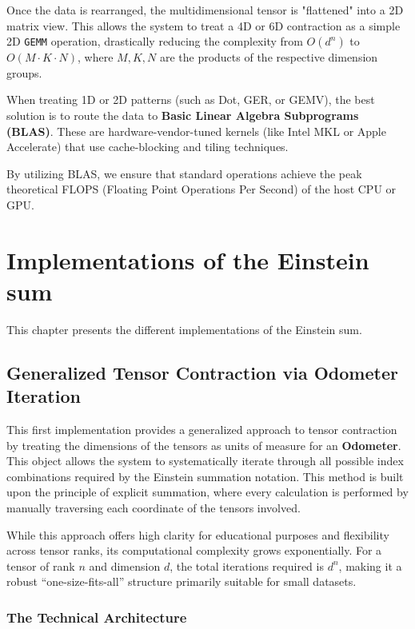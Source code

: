 \documentclass[binding=0.6cm]{sapthesis}
\begin{document}
\begin{description}
	      Once the data is rearranged, the multidimensional tensor is "flattened" into a 2D matrix view. This allows the system to treat a 4D or 6D contraction as a simple 2D \texttt{GEMM} operation, drastically reducing the complexity from $O(d^n)$ to $O(M \cdot K \cdot N)$, where $M, K, N$ are the products of the respective dimension groups.

	\item [BLAS Pattern Dispatching:]
	      When treating 1D or 2D patterns (such as Dot, GER, or GEMV), the best solution is to route the data to \textbf{Basic Linear Algebra Subprograms (BLAS)}. These are hardware-vendor-tuned kernels (like Intel MKL or Apple Accelerate) that use cache-blocking and tiling techniques.

	      By utilizing BLAS, we ensure that standard operations achieve the peak theoretical FLOPS (Floating Point Operations Per Second) of the host CPU or GPU.
\end{description}

\chapter{Implementations of the Einstein sum}
\label{chap:Implementations}

\noindent This chapter presents the different implementations of the Einstein sum.

\section{Generalized Tensor Contraction via Odometer Iteration}

This first implementation provides a generalized approach to tensor contraction by treating the dimensions of the tensors as units of measure for an \textbf{Odometer}. This object allows the system to systematically iterate through all possible index combinations required by the Einstein summation notation. This method is built upon the principle of explicit summation, where every calculation is performed by manually traversing each coordinate of the tensors involved.

While this approach offers high clarity for educational purposes and flexibility across tensor ranks, its computational complexity grows exponentially. For a tensor of rank $n$ and dimension $d$, the total iterations required is $d^n$, making it a robust ``one-size-fits-all'' structure primarily suitable for small datasets.

\subsection{The Technical Architecture}
\end{document}
